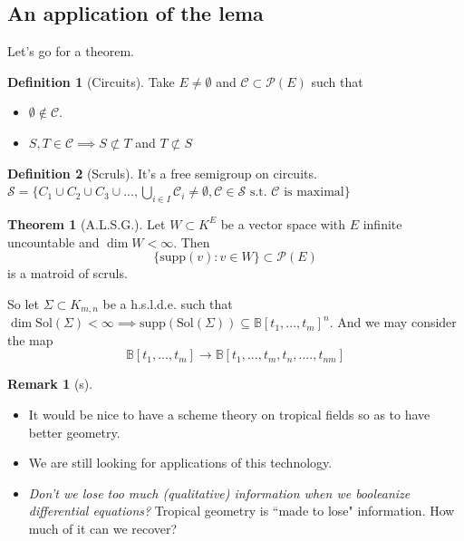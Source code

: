 \documentclass{article}
\theoremstyle{definition}
\newtheorem*{obs}{Remark}
\newtheorem{thm}{Theorem}
\newtheorem*{defn}{Definition}
\newcommand{\supp}{\text{supp}}
\newcommand{\Sol}{\text{Sol}}
\begin{document}
\subsection{An application of the lema}
Let's go for a theorem.
\begin{defn}[Circuits]
    Take $E\neq\emptyset$ and $\mathcal C\subset \mathcal P(E)$ such that
    \begin{itemize}
        \item $\emptyset\notin\mathcal C$.
        \item $S,T\in\mathcal C\implies S\not\subset T$ and $T\not\subset S$
    \end{itemize}
\end{defn}
\begin{defn}[Scruls]
    It's a free semigroup on circuits. $\mathcal S=\{C_1\cup C_2\cup C_3\cup...,\bigcup_{i\in I}\mathcal C_i\neq\emptyset, \mathcal C\in \mathcal S \text{ s.t. }\mathcal C\text{ is maximal}\}$
\end{defn}
\begin{thm}[A.L.S.G.]
    Let $W\subset K^E$ be a vector space with $E$ infinite uncountable and $\dim W<\infty$. Then
    $$\{\supp(v):v\in W\}\subset \mathcal P(E)$$
    is a matroid of scruls.
\end{thm}
So let $\Sigma\subset K_{m,n}$ be a h.s.l.d.e. such that $\dim\Sol(\Sigma)<\infty\implies\supp(\Sol(\Sigma))\subseteq\mathbb B[t_1,...,t_m]^n$. And we may consider the map
$$\mathbb B[t_1,...,t_m]\to\mathbb B[t_1,...,t_m,t_n,....,t_{nm}]$$
\begin{obs}[s]\leavevmode
\begin{itemize}
    \item It would be nice to have a scheme theory on tropical fields so as to have better geometry.
    \item We are still looking for applications of this technology.
    \item \textit{Don't we lose too much (qualitative) information when we booleanize differential equations?} Tropical geometry is ``made to lose" information. How much of it can we recover?
\end{itemize}
\end{obs}
\end{document}
